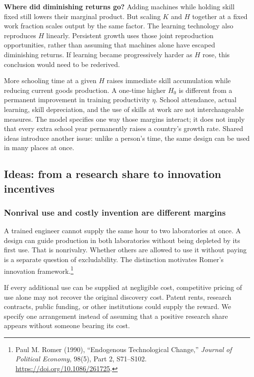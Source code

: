 \begin{redblock}
\textbf{Where did diminishing returns go?}
Adding machines while holding skill fixed still lowers their marginal product.
But scaling $K$ and $H$ together at a fixed work fraction scales output by
the same factor. The learning technology also reproduces $H$ linearly.
Persistent growth uses those joint reproduction opportunities, rather than
assuming that machines alone have escaped diminishing returns. If learning
became progressively harder as $H$ rose, this conclusion would need to be
rederived.
\end{redblock}

More schooling time at a given $H$ raises immediate skill accumulation while
reducing current goods production. A one-time higher $H_0$ is different from
a permanent improvement in training productivity $\eta$. School attendance,
actual learning, skill depreciation, and the use of skills at work are not
interchangeable measures. The model specifies one way those margins interact;
it does not imply that every extra school year permanently raises a country's
growth rate. Shared ideas introduce another issue: unlike a person's time,
the same design can be used in many places at once.

\subsection{Ideas: from a research share to innovation incentives}

\subsubsection{Nonrival use and costly invention are different margins}

A trained engineer cannot supply the same hour to two laboratories at once.
A design can guide production in both laboratories without being depleted by
its first use. That is nonrivalry. Whether others are allowed to use it without
paying is a separate question of excludability. The distinction motivates
Romer's innovation framework.\footnote{Paul M. Romer (1990), ``Endogenous
Technological Change,'' \textit{Journal of Political Economy}, 98(5), Part 2,
S71--S102. \url{https://doi.org/10.1086/261725}.}

If every additional use can be supplied at negligible cost, competitive pricing
of use alone may not recover the original discovery cost. Patent rents,
research contracts, public funding, or other institutions could supply the
reward. We specify one arrangement instead of assuming that a positive research
share appears without someone bearing its cost.

